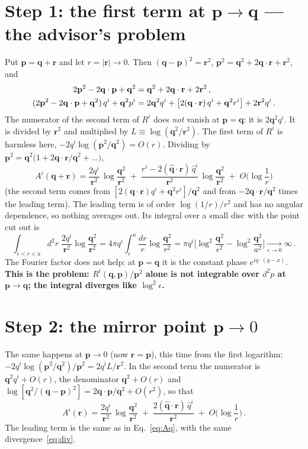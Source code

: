 \documentclass[11pt]{article}
\newcommand{\vq}{\mathbf{q}}
\newcommand{\vp}{\mathbf{p}}
\newcommand{\vr}{\mathbf{r}}
\newcommand{\qh}{\hat{\mathbf{q}}}
\begin{document}
\section{Step 1: the first term at $\mathbf{p}\to\mathbf{q}$ --- the advisor's problem}
Put $\vp=\vq+\vr$ and let $r=|\vr|\to0$. Then $(\vq-\vp)^{2}=\vr^{2}$, $\vp^{2}=\vq^{2}+2\vq\cdot\vr+\vr^{2}$, and
\begin{align}
2\vp^{2}-2\vq\cdot\vp+\vq^{2}&=\vq^{2}+2\vq\cdot\vr+2\vr^{2}\,,\notag\\
(2\vp^{2}-2\vq\cdot\vp+\vq^{2})\,q^{i}+\vq^{2}p^{i}&=2\vq^{2}q^{i}+\big[2(\vq\cdot\vr)\,q^{i}+\vq^{2}r^{i}\big]+2\vr^{2}q^{i}\,.
\end{align}
The numerator of the second term of $R^{i}$ does \emph{not} vanish at $\vp=\vq$: it is $2\vq^{2}q^{i}$. It is divided by $\vr^{2}$ and multiplied by $L\equiv\log(\vq^{2}/\vr^{2})$. The first term of $R^{i}$ is harmless here, $-2q^{i}\log(\vp^{2}/\vq^{2})=O(r)$. Dividing by $\vp^{2}=\vq^{2}\big(1+2\vq\cdot\vr/\vq^{2}+\dots\big)$,
\begin{equation}
\boxed{\;A^{i}(\vq+\vr)=\frac{2q^{i}}{\vr^{2}}\,\log\frac{\vq^{2}}{\vr^{2}}\;+\;\frac{r^{i}-2(\qh\cdot\vr)\,\hat q^{i}}{\vr^{2}}\,\log\frac{\vq^{2}}{\vr^{2}}\;+\;O\Big(\log\frac1r\Big)\;}\label{eq:Aq}
\end{equation}
(the second term comes from $[2(\vq\cdot\vr)q^{i}+\vq^{2}r^{i}]/\vq^{2}$ and from $-2\vq\cdot\vr/\vq^{2}$ times the leading term). The leading term is of order $\log(1/r)/r^{2}$ and has no angular dependence, so nothing averages out. Its integral over a small disc with the point cut out is
\begin{equation}
\int_{\epsilon<r<a}d^{2}r\;\frac{2q^{i}}{\vr^{2}}\log\frac{\vq^{2}}{\vr^{2}}=4\pi q^{i}\int_{\epsilon}^{a}\frac{dr}{r}\log\frac{\vq^{2}}{r^{2}}=\pi q^{i}\Big[\log^{2}\frac{\vq^{2}}{\epsilon^{2}}-\log^{2}\frac{\vq^{2}}{a^{2}}\Big]\xrightarrow[\epsilon\to0]{}\infty\,.\label{eq:div}
\end{equation}
The Fourier factor does not help: at $\vp=\vq$ it is the constant phase $e^{iq\cdot(y-x)}$. \textbf{This is the problem: $R^{i}(\vq,\vp)/\vp^{2}$ alone is not integrable over $d^{2}p$ at $\vp\to\vq$; the integral diverges like $\log^{2}\epsilon$.}

\section{Step 2: the mirror point $\mathbf{p}\to0$}
The same happens at $\vp\to0$ (now $\vr=\vp$), this time from the first logarithm: $-2q^{i}\log(\vp^{2}/\vq^{2})/\vp^{2}=2q^{i}L/\vr^{2}$. In the second term the numerator is $\vq^{2}q^{i}+O(r)$, the denominator $\vq^{2}+O(r)$ and $\log[\vq^{2}/(\vq-\vp)^{2}]=2\vq\cdot\vp/\vq^{2}+O(r^{2})$, so that
\begin{equation}
A^{i}(\vr)=\frac{2q^{i}}{\vr^{2}}\,\log\frac{\vq^{2}}{\vr^{2}}\;+\;\frac{2(\qh\cdot\vr)\,\hat q^{i}}{\vr^{2}}\;+\;O\Big(\log\frac1r\Big)\,.\label{eq:A0}
\end{equation}
The leading term is the same as in Eq.~\eqref{eq:Aq}, with the same divergence~\eqref{eq:div}.
\end{document}
